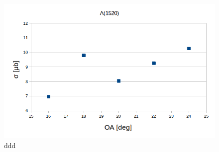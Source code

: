 \begin{figure}
  \centering
  \includegraphics[width=0.9\linewidth]{Chapter_analysis/systematics_OA.png}
  \caption{ddd}
  \label{fig:systematics_OA}
\end{figure}